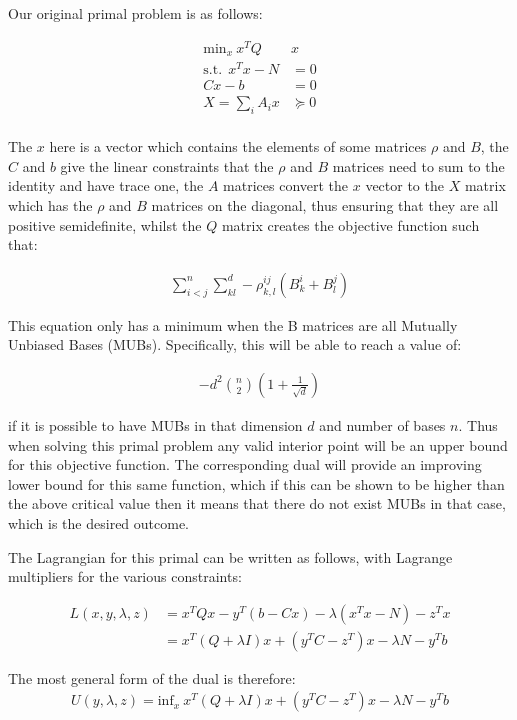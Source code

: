 \documentclass{article}
\begin{document}
Our original primal problem is as follows:

\begin{align}
	\text{min}_{x} ~ x^T Q &x \\
	\text{s.t.} ~~ x^T x - N &= 0 \\
	Cx - b &= 0 \\
	X = \sum_i A_i x &\succeq 0 \\
\end{align}

The $x$ here is a vector which contains the elements of some matrices $\rho$ and $B$, the $C$ and $b$ give the linear constraints that the $\rho$ and $B$ matrices need to sum to the identity and have trace one, the $A$ matrices convert the $x$ vector to the $X$ matrix which has the $\rho$ and $B$ matrices on the diagonal, thus ensuring that they are all positive semidefinite, whilst the $Q$ matrix creates the objective function such that:

\begin{align}
	\sum_{i<j}^n \sum_{kl}^d -\rho_{k,l}^{ij} (B_k^i + B_l^j)
\end{align}

This equation only has a minimum when the B matrices are all Mutually Unbiased Bases (MUBs). Specifically, this will be able to reach a value of:

\begin{align}
	-d^2 \binom{n}{2} \left(1+\frac{1}{\sqrt{d}}\right)
\end{align}

if it is possible to have MUBs in that dimension $d$ and number of bases $n$.  Thus when solving this primal problem any valid interior point will be an upper bound for this objective function. The corresponding dual will provide an improving lower bound for this same function, which if this can be shown to be higher than the above critical value then it means that there do not exist MUBs in that case, which is the desired outcome.

The Lagrangian for this primal can be written as follows, with Lagrange multipliers for the various constraints:

\begin{align}
	L(x, y, \lambda, z) &= x^T Q x - y^T (b-Cx) - \lambda (x^T x - N) - z^T x \\ 
						&= x^T ( Q + \lambda I) x + (y^TC - z^T) x - \lambda N - y^T b
\end{align}

The most general form of the dual is therefore:
\begin{align}
	U(y, \lambda, z) = \text{inf}_{x} ~  x^T ( Q + \lambda I) x + (y^TC - z^T) x - \lambda N - y^T b
\end{align}
\end{document}
